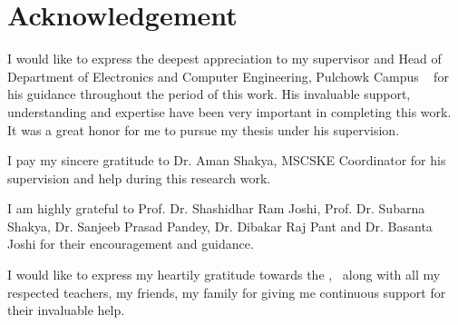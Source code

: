 \chapter*{Acknowledgement}


I would like to express the deepest appreciation to my supervisor and Head of Department of Electronics and Computer Engineering, Pulchowk Campus \myadvisorA~ for his guidance throughout the period of this work. His invaluable support, understanding and expertise have been very important in completing this work. It was a great honor for me to pursue my thesis under his supervision.

I pay my sincere gratitude to Dr. Aman Shakya, MSCSKE Coordinator for his supervision and help during this research work.

I am highly grateful to Prof. Dr. Shashidhar Ram Joshi, Prof. Dr. Subarna Shakya, Dr. Sanjeeb Prasad Pandey, Dr. Dibakar Raj Pant and Dr. Basanta Joshi for their encouragement and guidance.

I would like to express my heartily gratitude towards the \myinstitute, \mycampus ~along with all my respected teachers, my friends, my family for giving me continuous support for their invaluable help.


{\bf{\theauthor}}

{\bf{\roll}}


{\bf{\myinstitute}}


